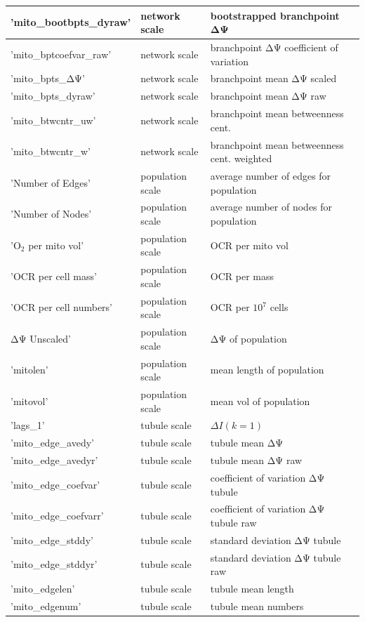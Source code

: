 \begin{longtable}{|l|l|l|}
	 'mito\_bootbpts\_dyraw' & network scale & bootstrapped branchpoint ΔΨ \\ \hline
	 'mito\_bptcoefvar\_raw' & network scale & branchpoint ΔΨ coefficient of variation \\ \hline
	 'mito\_bpts\_ΔΨ' & network scale & branchpoint mean ΔΨ scaled \\ \hline
	 'mito\_bpts\_dyraw' & network scale & branchpoint mean ΔΨ raw \\ \hline
	 'mito\_btwcntr\_uw' & network scale & branchpoint mean betweenness cent. \\ \hline
	 'mito\_btwcntr\_w' & network scale & branchpoint mean betweenness cent. weighted \\ \hline
	 'Number of Edges' & population scale & average number of edges for population \\ \hline
	 'Number of Nodes' & population scale & average number of nodes for population \\ \hline
	 'O$_2$ per mito vol' & population scale & OCR per mito vol \\ \hline
	 'OCR per cell mass' & population scale & OCR per mass \\ \hline
	 'OCR per cell numbers' & population scale & OCR per $10^7$ cells \\ \hline
	 ΔΨ Unscaled' & population scale & ΔΨ of population \\ \hline
	'mitolen' & population scale & mean length of population \\ \hline
	'mitovol' & population scale & mean vol of population \\ \hline
	 'lags\_1' & tubule scale & $ΔI(k=1)$ \\ \hline
	 'mito\_edge\_avedy' & tubule scale & tubule mean ΔΨ \\ \hline
	 'mito\_edge\_avedyr' & tubule scale & tubule mean ΔΨ raw \\ \hline
	 'mito\_edge\_coefvar' & tubule scale & coefficient of variation ΔΨ tubule \\ \hline
	 'mito\_edge\_coefvarr' & tubule scale & coefficient of variation ΔΨ tubule raw \\ \hline
	 'mito\_edge\_stddy' & tubule scale & standard deviation ΔΨ tubule  \\ \hline
	 'mito\_edge\_stddyr' & tubule scale & standard deviation ΔΨ tubule raw \\ \hline
	 'mito\_edgelen' & tubule scale & tubule mean length \\ \hline
	 'mito\_edgenum' & tubule scale & tubule mean numbers \\ \hline

\end{longtable}
